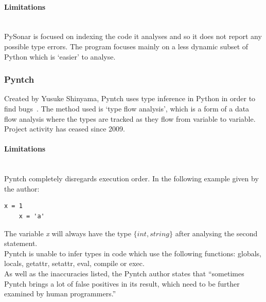 \documentclass[12pt, titlepage]{article}
\begin{document}
\paragraph{Limitations}\mbox{}\\
PySonar is focused on indexing the code it analyses and so it does not report any possible type errors. The program focuses mainly on a less dynamic subset of Python which is `easier' to analyse.

\subsubsection{Pyntch}
Created by Yusuke Shinyama, Pyntch uses type inference in Python in order to find bugs~\cite{pyntch}. The method used is `type flow analysis', which is a form of a data flow analysis where the types are tracked as they flow from variable to variable. \\
Project activity has ceased since 2009.
\paragraph{Limitations}\mbox{}\\
Pyntch completely disregards execution order. In the following example given by the author:
\begin{lstlisting}[mathescape]
	x = 1
	x = 'a'
\end{lstlisting}
The variable \textit{x} will always have the type $\{int, string\}$ after analysing the second statement. \\
Pyntch is unable to infer types in code which use the following functions: globals, locals, getattr, setattr, eval, compile or exec. \\
As well as the inaccuracies listed, the Pyntch author states that ``sometimes Pyntch brings a lot of false positives in its result, which need to be further examined by human programmers.''

\end{document}
